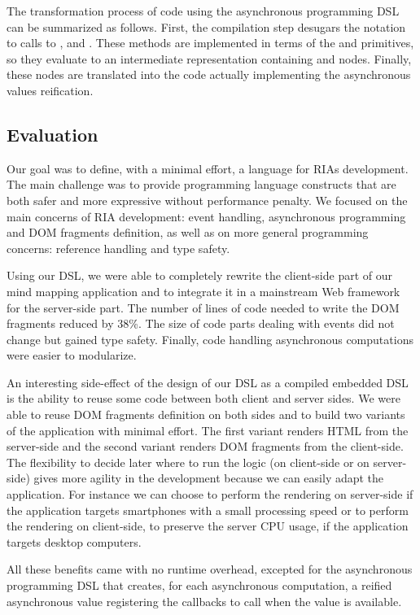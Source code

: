 \documentclass[american,english,runningheads]{llncs}
\begin{document}
The transformation process of code using the asynchronous programming DSL can be summarized as follows. First, the
compilation step desugars the  notation to calls to ,  and . These
methods are implemented in terms of the  and  primitives, so they evaluate to an intermediate
representation containing  and  nodes. Finally, these nodes are translated into the code actually
implementing the asynchronous values reification.

\subsection{Evaluation}

Our goal was to define, with a minimal effort, a language for RIAs development. The main challenge was to provide
programming language constructs that are both safer and more expressive without performance penalty. We focused on
the main concerns of RIA development: event handling, asynchronous programming and DOM fragments definition, as well
as on more general programming concerns:  reference handling and type safety.

Using our DSL, we were able to completely rewrite the client-side part of our mind mapping application and to
integrate it in a mainstream Web framework for the server-side part. The number of
lines of code needed to write the DOM fragments reduced by 38\%. The size of code parts dealing with events did not
change but gained type safety. Finally, code handling asynchronous computations were easier to modularize.

An interesting side-effect of the design of our DSL as a compiled embedded DSL is the ability to reuse some code
between both client and server sides. We were able to reuse DOM fragments definition on both sides and to build two
variants of the application with minimal effort. The first variant renders HTML from the server-side and the second
variant renders DOM fragments from the client-side. The flexibility to decide later where to run the logic (on
client-side or on server-side) gives more agility in the development because we can easily adapt the application. For
instance we can choose to perform the rendering on server-side if the application targets smartphones with a small
processing speed or to perform the rendering on client-side, to preserve the server CPU usage, if the application
targets desktop computers.

All these benefits came with no runtime overhead, excepted for the asynchronous programming DSL that creates, for
each asynchronous computation, a reified asynchronous value registering the callbacks to call when the value is
available.
\end{document}
